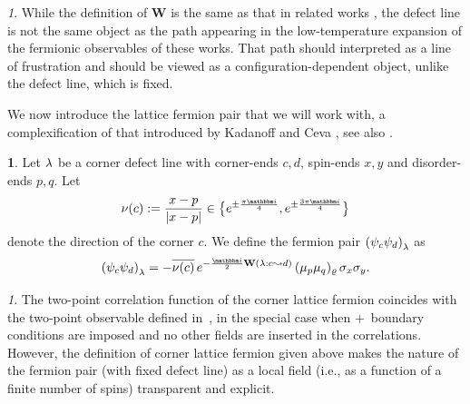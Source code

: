 \documentclass[12pt,oneside,english]{amsart}
\numberwithin{equation}{section}
\numberwithin{figure}{section}
\theoremstyle{plain}
\theoremstyle{plain}
\theoremstyle{plain}
\theoremstyle{plain}
\theoremstyle{remark}
\newtheorem{rem}[thm]{\protect\remarkname}
\theoremstyle{definition}
\newtheorem{defn}[thm]{\protect\definitionname}
\theoremstyle{plain}
\theoremstyle{plain}
\numberwithin{thm}{section}
\providecommand{\definitionname}{Definition}
\providecommand{\remarkname}{Remark}
\providecommand{\definitionname}{Definition}
\providecommand{\remarkname}{Remark}
\providecommand{\definitionname}{Definition}
\providecommand{\remarkname}{Remark}
\providecommand{\definitionname}{Definition}
\providecommand{\remarkname}{Remark}
\begin{document}
\begin{rem}
While the definition of $\mathbf{W}$ is the same as that in related
works \cite{chelkak-hongler-izyurov,chelkak-smirnov,hongler,hongler-smirnov},
the defect line is not the same object as the path appearing in the
low-temperature expansion of the fermionic observables of these works.
That path should interpreted as a line of frustration and should be
viewed as a configuration-dependent object, unlike the defect line,
which is fixed. 
\end{rem}

We now introduce the lattice fermion pair that we will work with,
a complexification of that introduced by Kadanoff and Ceva \cite{kadanoff-ceva},
see also \cite{dubedat-i,dubedat-iii}. 
\begin{defn}
\label{def:lattice-fermion}
Let ${\lambda}$ be a corner defect line
with corner-ends $c,d$, spin-ends $x,y$ and disorder-ends $p,q$.
Let
\[ \corndir(c) := \frac{x-p}{\left|x-p\right|} \in
    \big\{ e^{\pm\frac{\pi \ii }{4}},e^{\pm\frac{3\pi \ii }{4}} \big\} \]
denote the direction of the corner $c$. We define the fermion pair
$\left({\psi}_{c}{\psi}_{d}\right)_{{\lambda}}$ as 
\[
\left(\ferm_{c}\ferm_{d}\right)_{\cordefline}
= - \overline{\corndir(c)} \, e^{-\frac{\ii}{2}
  \mathbf{W} \left(\cordefline:c\leadsto d\right)} \,
  \dispair{p}{q}_{\disline} \, \spin_{x}\spin_{y}.
\]
\end{defn}

\begin{rem}
The two-point correlation function of the corner lattice fermion coincides with 
the two-point observable defined in~\cite{gheissari-hongler-park}, in the 
special case when
$+$~boundary conditions are imposed and no other fields are inserted in the 
correlations. However, the
definition of corner lattice fermion given above makes the nature of the 
fermion pair (with fixed defect line) as a
local field (i.e., as a function of a finite number of spins) transparent and 
explicit.

% 
\end{rem}
\end{document}
